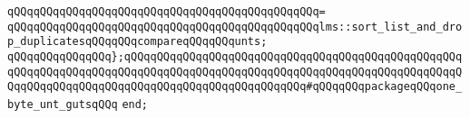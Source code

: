 \verb|qQQqqQQqqQQqqQQqqQQqqQQqqQQqqQQqqQQqqQQqqQQqqQQq=|\newline
\verb|qQQqqQQqqQQqqQQqqQQqqQQqqQQqqQQqqQQqqQQqqQQqqQQqlms::sort_list_and_drop_duplicatesqQQqqQQqcompareqQQqqQQqunts;|\newline
\newline
\verb|qQQqqQQqqQQqqQQq};qQQqqQQqqQQqqQQqqQQqqQQqqQQqqQQqqQQqqQQqqQQqqQQqqQQqqQQqqQQqqQQqqQQqqQQqqQQqqQQqqQQqqQQqqQQqqQQqqQQqqQQqqQQqqQQqqQQqqQQqqQQqqQQqqQQqqQQqqQQqqQQqqQQqqQQqqQQqqQQqqQQqqQQq#qQQqqQQqpackageqQQqone_byte_unt_gutsqQQq|\newline
\verb|end;|\newline
\newline
\newline
\newline

